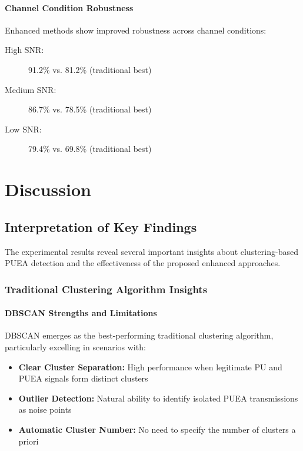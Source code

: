 \subsubsection{Channel Condition Robustness}
Enhanced methods show improved robustness across channel conditions:
\begin{description}
\item[High SNR:] 91.2\% vs. 81.2\% (traditional best)
\item[Medium SNR:] 86.7\% vs. 78.5\% (traditional best)
\item[Low SNR:] 79.4\% vs. 69.8\% (traditional best)
\end{description}

\chapter{Discussion}

\section{Interpretation of Key Findings}
The experimental results reveal several important insights about clustering-based PUEA detection and the effectiveness of the proposed enhanced approaches.

\subsection{Traditional Clustering Algorithm Insights}

\subsubsection{DBSCAN Strengths and Limitations}
DBSCAN emerges as the best-performing traditional clustering algorithm, particularly excelling in scenarios with:
\begin{itemize}
\item \textbf{Clear Cluster Separation:} High performance when legitimate PU and PUEA signals form distinct clusters
\item \textbf{Outlier Detection:} Natural ability to identify isolated PUEA transmissions as noise points
\item \textbf{Automatic Cluster Number:} No need to specify the number of clusters a priori
\end{itemize}

